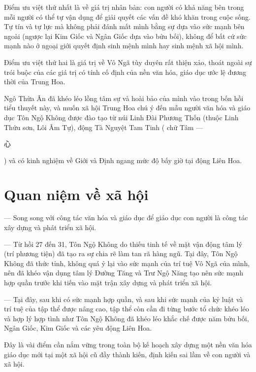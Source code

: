 Điểm ưu việt thứ nhất là về giá trị nhân bản: con người có khả năng bên trong mỗi người có thể tự vận dụng để giải quyết các vấn đề khó khăn trong cuộc sống. Tự tín và tự lực mà không phải đánh mất mình bằng sự dựa vào sức mạnh bên ngoài (ngược lại Kim Giốc và Ngân Giốc dựa vào bửu bối), không để bất cứ sức mạnh nào ở ngoại giới quyết định sinh mệnh mình hay sinh mệnh xã hội mình.

Điểm ưu việt thứ hai là giá trị về Vô Ngã tùy duyên rất thiện xảo, thoát ngoài sự trói buộc của các giá trị có tính cố định của nền văn hóa, giáo dục ước lệ đương thời của Trung Hoa.

Ngô Thừa Ân đã khéo léo lồng tâm sự và hoài bảo của mình vào trong bốn hồi tiểu thuyết này, và muốn xã hội Trung Hoa chú ý đến mẫu người văn hóa và giáo dục Tôn Ngộ Không được đào tạo từ núi Linh Đài Phương Thốn (thuộc Linh Thứu sơn, Lôi Âm Tự), động Tà Nguyệt Tam Tinh ( chữ Tâm --- \begin{CJK*}{UTF8}{gbsn}心 \end{CJK*}) và có kinh nghiệm về Giới và Định ngang mức độ bấy giờ tại động Liên Hoa.

\section{Quan niệm về xã hội} %
\label{sec:33_34_xa_hoi}

--- Song song với công tác văn hóa và giáo dục để giáo dục con người là công tác xây dựng và phát triển xã hội.

--- Từ hồi 27 đến 31, Tôn Ngộ Không do thiếu tinh tế về mặt vận động tâm lý (trí phương tiện) đã tạo ra sự chia rẽ làm tan rã hàng ngũ. Tại đây, Tôn Ngộ Không đã thức tỉnh, không quá ỷ lại vào sức mạnh của trí tuệ Vô Ngã của mình, nên đã khéo vận dụng tâm lý Đường Tăng và Trư Ngộ Năng tạo nên sức mạnh hợp quần trước khi tiến vào mặt trận xây dựng và phát triển xã hội.

--- Tại đây, sau khi có sức mạnh hợp quần, và sau khi sức mạnh của kỷ luật và trí tuệ của tập thể được nâng cao, tập thể còn cần đi từng bước tổ chức khéo léo và hợp lý hợp tình như Tôn Ngộ Không đã khéo léo khắc chế được năm bửu bối, Ngân Giốc, Kim Giốc và các yêu động Liên Hoa.

Đây là vài điểm cần nắm vững trong toàn bộ kế hoạch xây dựng một nền văn hóa giáo dục mới tại một xã hội cũ đầy thành kiến, định kiến sai lầm về con người và xã hội.
